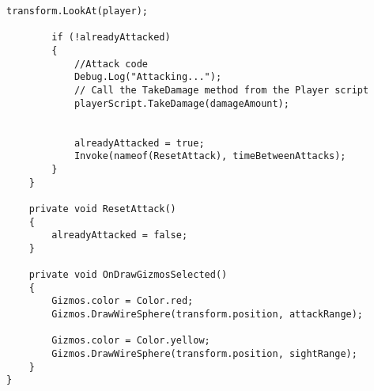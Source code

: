 \begin{lstlisting}[language=CSharp,caption={EnemyController},label=code:]
        transform.LookAt(player);

        if (!alreadyAttacked)
        {
            //Attack code
            Debug.Log("Attacking...");
            // Call the TakeDamage method from the Player script
            playerScript.TakeDamage(damageAmount);


            alreadyAttacked = true;
            Invoke(nameof(ResetAttack), timeBetweenAttacks);
        }
    }

    private void ResetAttack()
    {
        alreadyAttacked = false;
    }

    private void OnDrawGizmosSelected()
    {
        Gizmos.color = Color.red;
        Gizmos.DrawWireSphere(transform.position, attackRange);
        
        Gizmos.color = Color.yellow;
        Gizmos.DrawWireSphere(transform.position, sightRange);
    }
}
\end{lstlisting}